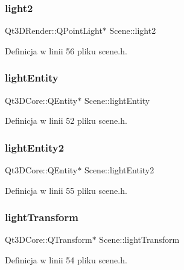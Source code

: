 \subsubsection{\texorpdfstring{light2}{light2}}
{\footnotesize\ttfamily Qt3\+D\+Render\+::\+Q\+Point\+Light$\ast$ Scene\+::light2}



Definicja w linii 56 pliku scene.\+h.

\mbox{\label{class_scene_a932f32946da0283ac184a28cb13f4427}} 
\subsubsection{\texorpdfstring{light\+Entity}{lightEntity}}
{\footnotesize\ttfamily Qt3\+D\+Core\+::\+Q\+Entity$\ast$ Scene\+::light\+Entity}



Definicja w linii 52 pliku scene.\+h.

\mbox{\label{class_scene_a9ad241dc981470f63bb5d7a5bd25888e}} 
\subsubsection{\texorpdfstring{light\+Entity2}{lightEntity2}}
{\footnotesize\ttfamily Qt3\+D\+Core\+::\+Q\+Entity$\ast$ Scene\+::light\+Entity2}



Definicja w linii 55 pliku scene.\+h.

\mbox{\label{class_scene_a24f2698364e45c011a80c51747a62bae}} 
\subsubsection{\texorpdfstring{light\+Transform}{lightTransform}}
{\footnotesize\ttfamily Qt3\+D\+Core\+::\+Q\+Transform$\ast$ Scene\+::light\+Transform}



Definicja w linii 54 pliku scene.\+h.

\mbox{\label{class_scene_af5b3d0a98c256da599ddd8973016b10b}} 
